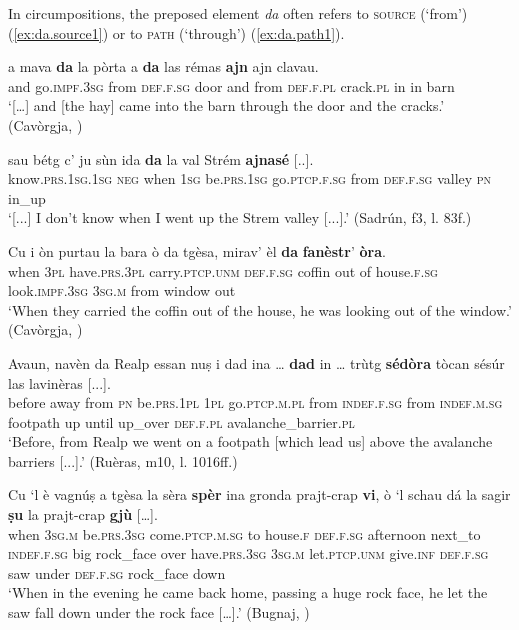 In circumpositions, the preposed element \textit{da} often refers to \textsc{source} (`from') (\ref{ex:da.source1}) or to \textsc{path} (`through') (\ref{ex:da.path1}).

\ea
\label{ex:da.path1}
\gll […] a mava \textbf{da} la pòrta a \textbf{da} las rémas \textbf{ajn} ajn clavau.\\
{} and go.\textsc{impf.3sg} from \textsc{def.f.sg} door and from \textsc{def.f.pl} crack.\textsc{pl} in in barn \\
\glt `[…] and [the hay] came into the barn through the door and the cracks.' (Cavòrgja, \citealt[121]{Büchli1966})
\z

\ea
\label{ex:da.path2}
\gll  [...] sau bétg c’ ju sùn ida \textbf{da} la val Strém \textbf{ajnasé} [..].\\
{} know.\textsc{prs.1sg.1sg} \textsc{neg} when \textsc{1sg} be.\textsc{prs.1sg} go.\textsc{ptcp.f.sg} from \textsc{def.f.sg} valley \textsc{pn} in\_up\\
\glt `[...] I don’t know when I went up the Strem valley [...].' (Sadrún, f3, l. 83f.)
\z

\ea
\label{ex:da.source1}
\gll Cu i òn purtau la bara ò da tgèsa, mirav’ èl \textbf{da} \textbf{fanèstr}’ \textbf{òra}.\\
when \textsc{3pl} have.\textsc{prs.3pl} carry.\textsc{ptcp.unm} \textsc{def.f.sg} coffin out of house.\textsc{f.sg}
look.\textsc{impf.3sg} \textsc{3sg.m} from window out\\
\glt `When they carried the coffin out of the house, he was looking out of the window.' (Cavòrgja, \citealt[123]{Büchli1966})
\z

\ea
\label{ex:dasedora1}
\gll  Avaun, navèn da Realp essan nuṣ i dad ina … \textbf{dad} in … trùtg \textbf{sédòra} tòcan sésúr las lavinèras [...]. \\
before away from \textsc{pn} be.\textsc{prs.1pl} \textsc{1pl} go.\textsc{ptcp.m.pl} from \textsc{indef.f.sg} {} from \textsc{indef.m.sg} {} footpath up until up\_over \textsc{def.f.pl} avalanche\_barrier.\textsc{pl} \\
\glt `Before, from Realp we went on a footpath [which lead us] above the avalanche barriers [...].' (Ruèras, m10, l. 1016ff.)
\z

\ea
\label{ex:spervi1}
\gll Cu ‘l è vagnúṣ a tgèsa la sèra \textbf{spèr} ina gronda prajt-crap \textbf{vi}, ò `l schau dá la sagir \textbf{ṣu} la prajt-crap \textbf{gjù} […].\\ 
when \textsc{3sg.m} be.\textsc{prs.3sg} come.\textsc{ptcp.m.sg} to house.\textsc{f} \textsc{def.f.sg} afternoon next\_to \textsc{indef.f.sg} big rock\_face over have.\textsc{prs.3sg} \textsc{3sg.m} let.\textsc{ptcp.unm} give.\textsc{inf} \textsc{def.f.sg} saw under \textsc{def.f.sg} rock\_face down\\
\glt `When in the evening he came back home, passing a huge rock face, he let the saw fall down under the rock face […].' (Bugnaj, \citealt[135]{Büchli1966})
\z

